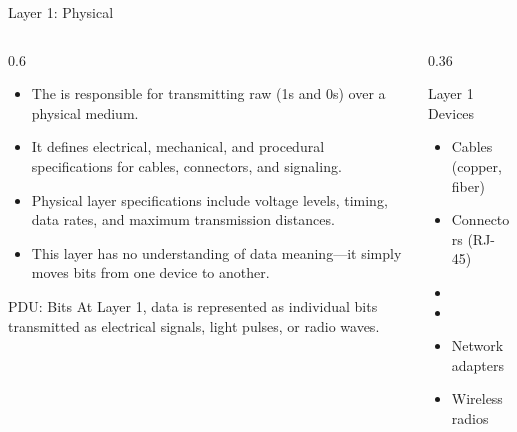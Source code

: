 \documentclass[aspectratio=169]{beamer}  %
\begin{document}
\begin{frame}{Layer 1: Physical}
    \begin{columns}[T]
        \begin{column}{0.6\textwidth}
            \begin{itemize}
                \item The  is responsible for transmitting raw  (1s and 0s) over a physical medium.
                \item It defines electrical, mechanical, and procedural specifications for cables, connectors, and signaling.
                \item Physical layer specifications include voltage levels, timing, data rates, and maximum transmission distances.
                \item This layer has no understanding of data meaning---it simply moves bits from one device to another.
            \end{itemize}
            
            \vspace{0.3em}
            \begin{alertblock}{PDU: Bits}
                At Layer 1, data is represented as individual bits transmitted as electrical signals, light pulses, or radio waves.
            \end{alertblock}
        \end{column}
        \begin{column}{0.36\textwidth}
            \begin{block}{Layer 1 Devices}
                \begin{itemize}
                    \item Cables (copper, fiber)
                    \item Connectors (RJ-45)
                    \item {}
                    \item {}
                    \item Network adapters
                    \item Wireless radios
                \end{itemize}
            \end{block}
        \end{column}
    \end{columns}
\end{frame}
\end{document}
